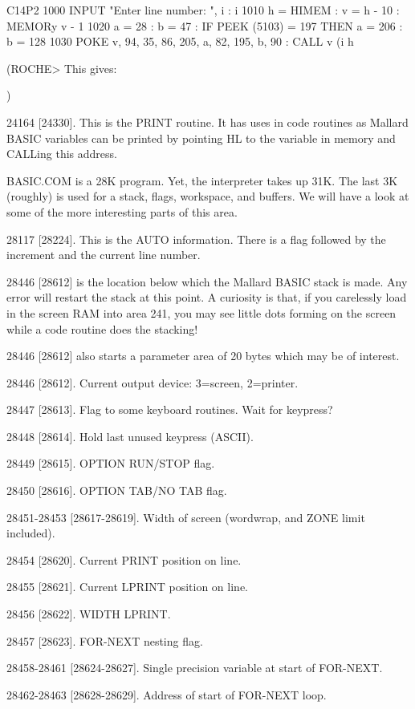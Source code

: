         C14P2
        1000 INPUT "Enter line number: ", i : i%
        1010 h = HIMEM : v = h - 10 : MEMORy v - 1
        1020 a = 28 : b = 47 : IF PEEK (5103) = 197 THEN a = 206 : b = 128
        1030 POKE v, 94, 35, 86, 205, a, 82, 195, b, 90 : CALL v (i%
h

(ROCHE> This gives:

$$$$
)

24164  [24330].  This is the PRINT routine. It has uses in  code  routines  as 
Mallard  BASIC  variables  can be printed by pointing HL to  the  variable  in 
memory and CALLing this address.

BASIC.COM  is  a 28K program. Yet, the interpreter takes up 31K. The  last  3K 
(roughly)  is used for a stack, flags, workspace, and buffers. We will have  a 
look at some of the more interesting parts of this area.

28117  [28224]. This is the AUTO information. There is a flag followed by  the 
increment and the current line number.

28446 [28612] is the location below which the Mallard BASIC stack is made. Any 
error  will  restart  the stack at this point. A curiosity  is  that,  if  you 
carelessly  load  in  the screen RAM into area 241, you may  see  little  dots 
forming on the screen while a code routine does the stacking!

28446  [28612]  also  starts  a parameter area of 20 bytes  which  may  be  of 
interest.

28446 [28612]. Current output device: 3=screen, 2=printer.

28447 [28613]. Flag to some keyboard routines. Wait for keypress?

28448 [28614]. Hold last unused keypress (ASCII).

28449 [28615]. OPTION RUN/STOP flag.

28450 [28616]. OPTION TAB/NO TAB flag.

28451-28453   [28617-28619].  Width  of  screen  (wordwrap,  and  ZONE   limit 
included).

28454 [28620]. Current PRINT position on line.

28455 [28621]. Current LPRINT position on line.

28456 [28622]. WIDTH LPRINT.

28457 [28623]. FOR-NEXT nesting flag.

28458-28461 [28624-28627]. Single precision variable at start of FOR-NEXT.

28462-28463 [28628-28629]. Address of start of FOR-NEXT loop.

